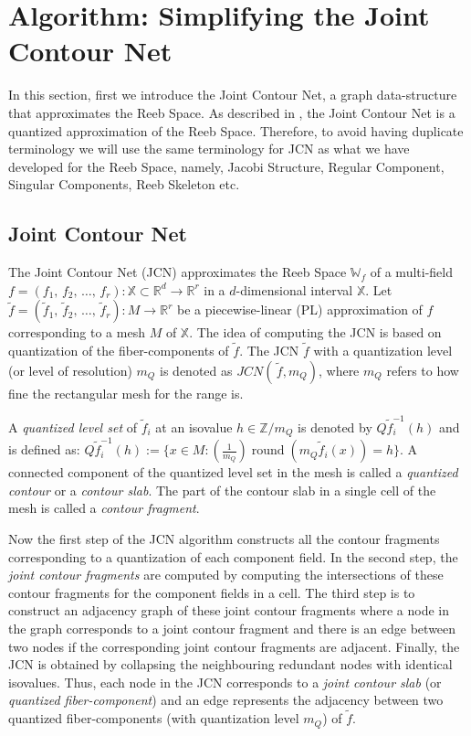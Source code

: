 \documentclass[twocolumn]{article}
\newcommand{\X}{\mathbb{X}}
\newcommand{\RS}{\mathbb{W}_f}
\newcommand{\JCN}[2]{JCN#1\,#2}
\begin{document}
\section{Algorithm: Simplifying the Joint Contour Net}
\label{sec:SimplifyingJCN}
In this section, first we introduce the Joint Contour Net, a graph
data-structure that approximates the Reeb Space.
As described in \cite{2013-Carr-TVCG}, the Joint Contour Net is a
quantized approximation of the Reeb Space. Therefore, to avoid having
duplicate terminology we will use the same terminology for JCN
as what we have developed for the Reeb Space, namely, Jacobi Structure, Regular
Component, Singular Components, Reeb Skeleton etc.

\subsection{Joint Contour Net}
\label{sec:jcn}
The Joint Contour Net (JCN) \cite{2013-Carr-TVCG, 2012-Duke-VisWeek} approximates the 
Reeb Space $\RS$ of a multi-field $f=(f_1,\,f_2,\,\ldots,\,f_r):\X\subset\mathbb{R}^d\rightarrow \mathbb{R}^r$
in a $d$-dimensional interval  $\X$. Let
$\tilde{f}=(\tilde{f}_1,\,\tilde{f}_2,\,\ldots,\,\tilde{f}_r):
M\rightarrow \mathbb{R}^r$ be a piecewise-linear (PL) approximation of $f$ corresponding to a
mesh $M$ of $\X$. The idea of computing the JCN is based on
quantization of the fiber-components of $\tilde{f}$. The JCN $\tilde{f}$ with a
quantization level (or level of resolution) $m_Q$ is denoted as
$\JCN(\tilde{f}, m_Q)$, where $m_Q$ refers to how fine the rectangular mesh
for the range is. 


A \textit{quantized level set} of $\tilde{f}_i$ at an isovalue $h \in
\mathbb{Z}/m_Q$ is denoted by $Q\tilde{f}_i^{-1}(h)$ and is
defined as:
$ Q\tilde{f}_i^{-1}(h):=\big\{x\in M : (\frac{1}{m_Q}) \operatorname{round}(m_Q\tilde{f}_i(x))=h\}$.
A connected component of the quantized level set in the mesh is called
a \textit{quantized contour} or a \textit{contour slab}. The part of the
contour slab in a single cell of the mesh is called a \textit{contour
  fragment}. 
  
Now the first step of the JCN algorithm constructs all the
contour fragments corresponding to a quantization of each component
field. In the second step, the \textit{joint contour fragments} are computed by
computing the intersections of these contour fragments for the component
fields in a cell. The third step is to construct an adjacency graph of these
joint contour fragments where a node in the graph corresponds to a joint
contour fragment and there is an edge between two nodes if the corresponding
joint contour fragments are adjacent. Finally, the JCN is obtained by
collapsing the neighbouring redundant nodes with identical isovalues.
Thus, each node in the JCN corresponds to a \textit{joint contour
  slab} (or \emph{quantized fiber-component}) and an edge represents the
adjacency between two quantized fiber-components (with quantization level $m_Q$) of $\tilde{f}$.
\end{document}
